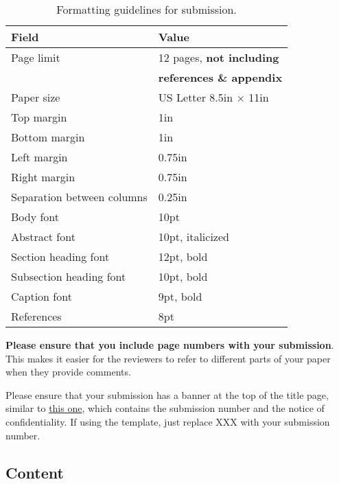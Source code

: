 \documentclass[pageno]{jpaper}
\begin{document}
\begin{table}[h!]
  \centering
  \begin{tabular}{|l|l|}
    \hline
    \textbf{Field} & \textbf{Value}\\
    \hline
    \hline
    Page limit & 12 pages, {\bf not including}\\
               & {\bf references \& appendix}\\
    \hline
    Paper size & US Letter 8.5in $\times$ 11in\\
    \hline
    Top margin & 1in\\
    \hline
    Bottom margin & 1in\\
    \hline
    Left margin & 0.75in\\
    \hline
    Right margin & 0.75in\\
    \hline
    Separation between columns & 0.25in\\
    \hline
    Body font & 10pt\\
    \hline
    Abstract font & 10pt, italicized\\
    \hline
    Section heading font & 12pt, bold\\
    \hline
    Subsection heading font & 10pt, bold\\
    \hline
    Caption font & 9pt, bold\\
    \hline
    References & 8pt\\
    \hline
  \end{tabular}
  \caption{Formatting guidelines for submission. }
  \label{table:formatting}
\end{table}

\textbf{Please ensure that you include page numbers with your
submission}. This makes it easier for the reviewers to refer to different
parts of your paper when they provide comments.

Please ensure that your submission has a banner at the top of the title
page, similar to
\href{http://www.cs.utah.edu/asplos14/files/asplos14-template.pdf}{this
one}, which contains the submission number and the notice of
confidentiality.  If using the template, just replace XXX with your
submission number.

\subsection{Content}
\end{document}
